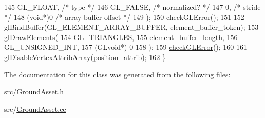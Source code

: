 \begin{DoxyCode}
145     GL\_FLOAT,   \textcolor{comment}{/* type */}
146     GL\_FALSE,   \textcolor{comment}{/* normalized? */}
147     0,        \textcolor{comment}{/* stride */}
148     (\textcolor{keywordtype}{void}*)0    \textcolor{comment}{/* array buffer offset */}
149   );
150   \hyperlink{GroundAsset_8cc_a75f201b0e53e68726854997957322b8d}{checkGLError}();
151 
152   glBindBuffer(GL\_ELEMENT\_ARRAY\_BUFFER, element\_buffer\_token);
153   glDrawElements(
154     GL\_TRIANGLES,
155     element\_buffer\_length,
156     GL\_UNSIGNED\_INT,
157     (GLvoid*) 0
158   );
159   \hyperlink{GroundAsset_8cc_a75f201b0e53e68726854997957322b8d}{checkGLError}();
160 
161   glDisableVertexAttribArray(position\_attrib);
162 \}
\end{DoxyCode}


The documentation for this class was generated from the following files\+:\begin{DoxyCompactItemize}
\item 
src/\hyperlink{GroundAsset_8h}{Ground\+Asset.\+h}\item 
src/\hyperlink{GroundAsset_8cc}{Ground\+Asset.\+cc}\end{DoxyCompactItemize}
